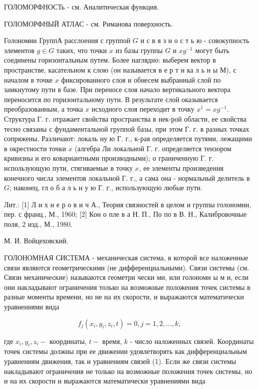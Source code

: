 \documentclass[10pt]{article}
\begin{document}
ГОЛОМОРФНОСТь - см. Аналитическая функция.



ГОЛОМОРФНЫЙ АТЛАС - см. Риманова поверхность.



Голономии ГруппА расслоения с группой $G$ и с в я з н о с т ь ю - совокупность элементов $g \in G$ таких, что точки $x$ из базы группы $G$ и $x g^{-1}$ могут быть соединены горизонтальным путем. Более наглядно: выберем вектор в пространстве, касательном к слою (он называется в е р т и ка л ь н ы М), с началом в точке $x$ фиксированного слоя и обнесем выбранный слой по замкнутому пути в базе. При переносе слоя начало вертикального вектора переносится по горизонтальному пути. В результате слой оказывается преобразованным, а точка $x$ исходного слоя переходит в точку $x^{1}=x g^{-1}$. Структура Г. г. отражает свойства пространства в нек-рой области, ее свойства тесно связаны с фундаментальной группой базы, при этом Г. г. в разных точках сопряжены. Различают: локаль ну ю Г. г., к-рая определяется путями, лежащими в окрестности точки $x$ (алгебра Ли локальной Г. г. определяется тензором кривизны и его ковариантными производными); о граниченную Г. г. использующую пути, стягиваемые в точку $x$, ее элементы произведения конечного числа элементов локальной Г. г., а сама она - нормальный делитель в $G$; наконец, гл о б а л ь н у ю Г. г., использующую любые пути.



Лит.: [1] Л и х н е р о в и ч А., Теория связностей в целом и группы голономии, пер. с франц., М., 1960; [2] Кон о пле в а Н. П., По по в В. Н., Калибровочные поля, 2 изд., М., 1980.



М. И. Войцеховский.



ГОЛОНОМНАЯ СИСТЕМА - механическая система, в которой все наложенные связи являются геометрическими (не дифференциальными). Связи системы (см. Связи механические) называются геометри чески ми, или голономн ы м и, если они накладывают ограничения только на возможные положения точек системы в разные моменты времени, но не на их скорости, и выражаются математически уравнениями вида



\[

f_{j}\left(x_{i}, y_{i}, z_{i}, t\right)=0, j=1,2, \ldots, k,

\]



где $x_{i}, y_{i}, z_{i}-$ координаты, $t-$ время, $k$ - число наложенных связей. Координаты точек системы должны при ее движении удовлетворять как дифференциальным уравнениям движения, так и уравнениям связей (1). Если же связи системы накладывают ограничения не только на возможные положения точек системы, но и на их скорости и выражаются математически уравнениями вида
\end{document}
